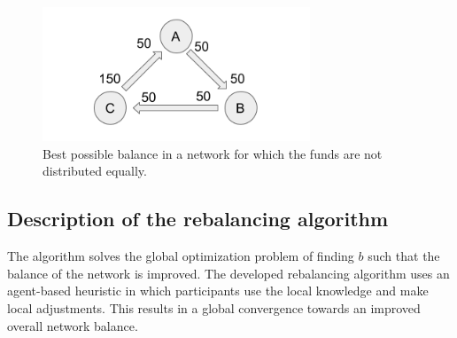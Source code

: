 \documentclass[a4paper]{paper}
\begin{document}
\begin{figure}
 \centering
 \includegraphics[width=8cm]{img/oddBalanced.png}
 \caption{Best possible balance in a network for which the funds are not distributed equally.}
 \label{fig:oddBalanced}
\end{figure}



\subsection{Description of the rebalancing algorithm}
\label{sec:Algorithm}

The algorithm solves the global optimization problem of finding $b$ such that the balance of the network is improved.
The developed rebalancing algorithm uses an agent-based heuristic in which participants use the local knowledge and make local adjustments. 
This results in a global convergence towards an improved overall network balance. 
\end{document}
